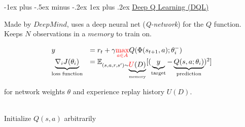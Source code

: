 \documentclass[10pt,landscape]{article}
\makeatletter
\renewcommand{\subsubsection}{\@startsection{subsubsection}{3}{0mm}%
    {-1ex plus -.5ex minus -.2ex}%
    {1ex plus .2ex}%
    {\normalfont\small\bfseries}}
\makeatother
\begin{document}
\begin{multicols}{3}
\subsubsection{\href{https://en.wikipedia.org/wiki/Q-learning\#Deep_Q-learning}{Deep Q Learning (DQL)}}

Made by $DeepMind$, uses a deep neural net (\emph{Q-network}) for the $Q$ function.
Keeps $N$ observations in a $memory$ to train on.

\begin{equation}
    \begin{array}{l l}
        y &= r_t + \gamma \red{\max\limits_{a \in A}} Q(\Phi(s_{t+1},a); \theta_i^{-})\\
        \underbrace{\nabla_{i}J(\theta_{i})}_\text{loss function} &= \mathbb{E}_{(s, a, r, s') \sim \underbrace{\red{U}(D)}_\text{memory}} [(
            \underbrace{y}_\text{target} %
            - \underbrace{Q(s,a;\theta_i)}_\text{prediction})^2]\\
    \end{array}
\end{equation}

for network weights $\theta$ and experience replay history $U(D)$.

\begin{algorithm}[H]
 \\
 Initialize $Q(s,a)$ arbitrarily \\
\end{algorithm}


\end{multicols}
\end{document}
